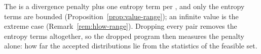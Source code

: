 
The  is a divergence penalty plus one entropy term per
, and only the entropy terms are bounded
(Proposition~\ref{prop:value-range}); an infinite value is the extreme case
(Remark~\ref{rem:hlow-range}). Dropping every pair removes the entropy terms
altogether, so the dropped program then measures the penalty alone: how far
the accepted distributions lie from the statistics of the feasible set.

